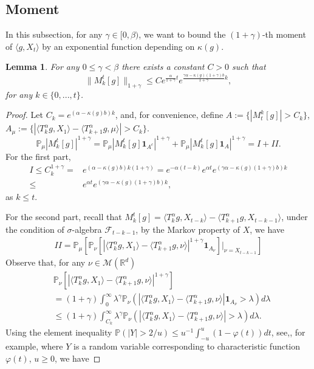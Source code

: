 \documentclass[12pt, a4paper]{amsart}
\newtheorem{lem}[thm]{Lemma}
\theoremstyle{definition}
\numberwithin{equation}{section}
\begin{document}
\subsection{Moment}

 In this subsection, for any $\gamma \in [0,\beta)$, we want to bound the $(1+\gamma)$-th moment of $\langle g ,X_t \rangle $ by an exponential function depending on $\kappa(g)$.
\begin{lem}\label{lemma23}
For any $0\leq \gamma < \beta$ there exists a constant $C>0$ such that
$$\|M_k^t[g]\|_{1+\gamma}\leq C e^{\frac{\alpha}{1+\gamma}t}e^{\frac{\gamma \alpha-\kappa(g)(1+\gamma)b}{1+\gamma}k},$$
for any $k \in \{0,...,t\}$.
\end{lem}

\begin{proof}
    Let $C_k=e^{(\alpha-\kappa(g)b)k}$, and, for convenience, define $A:=\{|M_t^k[g]|>C_k\}$, $A_{\mu}:=\{|\langle T_k^{\alpha}g, X_1\rangle-\langle T_{k+1}^{\alpha}g,\mu\rangle|>C_k\}$.
$$\mathbb{P}_{\mu}|M_k^t[g]|^{1+\gamma}=\mathbb{P}_{\mu}|M_k^t[g]\mathbf{1}_{A^c}|^{1+\gamma}+\mathbb{P}_{\mu}|M_k^t[g]\mathbf{1}_{A}|^{1+\gamma}=I+II.$$
For the first part,
\begin{align*}
    I\leq C_k^{1+\gamma}=&e^{(\alpha-\kappa(g)b)k(1+\gamma)}=e^{-\alpha(t-k)}e^{\alpha t}e^{(\gamma \alpha-\kappa(g)(1+\gamma)b)k}\\
    \leq &e^{\alpha t}e^{(\gamma \alpha-\kappa(g)(1+\gamma)b)k},
\end{align*}
as $k\leq t$.

For the second part, recall that $M_k^t[g]=\langle T_k^{\alpha}g, X_{t-k}\rangle-\langle T_{k+1}^{\alpha}g,X_{t-k-1}\rangle$,
under the condition of $\sigma$-algebra $\mathcal{F}_{t-k-1}$, by the Markov property of $X$, we have
\begin{align*}
    II=\mathbb{P}_{\mu}\left[\mathbb{P}_{\nu}\left[|\langle T_k^{\alpha}g, X_1\rangle-\langle T_{k+1}^{\alpha}g,\nu\rangle|^{1+\gamma}\mathbf{1}_{A_{\nu}}\right]|_{\nu=X_{t-k-1}}\right]
\end{align*}
Observe that, for any $\nu \in \mathcal{M}(\mathbb{R}^d)$
\begin{align}
    &\mathbb{P}_{\nu}\left[|\langle T_k^{\alpha}g, X_1\rangle-\langle T_{k+1}^{\alpha}g,\nu\rangle|^{1+\gamma}\right] \label{temp1}\\ 
    &=(1+\gamma)\int_0^{\infty}\lambda^{\gamma}\mathbb{P}_{\nu}\left(|\langle T_k^{\alpha}g, X_1\rangle-\langle T_{k+1}^{\alpha}g,\nu\rangle|\mathbf{1}_{A_{\nu}}>\lambda\right)d\lambda \nonumber\\
    &\leq (1+\gamma)\int_{C_{k}}^{\infty}\lambda^{\gamma}\mathbb{P}_{\nu}\left(|\langle T_k^{\alpha}g, X_1\rangle-\langle T_{k+1}^{\alpha}g,\nu\rangle|>\lambda\right)d\lambda.\nonumber
\end{align}
Using the element inequality $\mathbb{P}(|Y|>2/u)\leq u^{-1}\int_{-u}^{u}(1-\varphi(t))dt$, see,\cite[Chaper 3]{Durrett2010Probability}, for example, where $Y$ is a random variable corresponding to characteristic function $\varphi(t)$, $u\geq 0$, we have


\end{proof}
\end{document}
